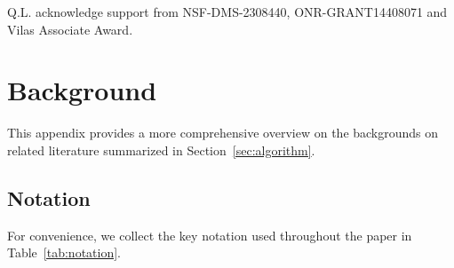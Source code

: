 \documentclass{article}
\theoremstyle{plain}
\theoremstyle{definition}
\begin{document}
\begin{ack}
Q.L. acknowledge support from NSF-DMS-2308440, ONR-GRANT14408071 and Vilas Associate Award. 
\end{ack}


{\small
	
	
}

\newpage

\newpage 

\appendix

\section{Background}\label{app:prelim}
This appendix provides a more comprehensive overview on the backgrounds on related literature summarized in Section~\ref{sec:algorithm}.

\subsection{Notation}\label{app:notation}
For convenience, we collect the key notation used throughout the paper in Table~\ref{tab:notation}.
\end{document}
